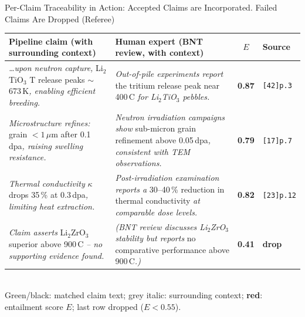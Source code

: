 \documentclass[aspectratio=169, 11pt]{beamer}
\begin{document}
\begin{frame}[shrink=25]{Per-Claim Traceability in Action: Accepted Claims are Incorporated. Failed Claims Are Dropped (Referee)}
\centering
\vspace{-4pt}
\setlength\tabcolsep{3pt}
\renewcommand{\arraystretch}{1.0}
\tiny
\begin{tabular}{@{}p{5.4cm}p{5.4cm}cp{0.9cm}@{}}
\toprule
\textbf{Pipeline claim (with surrounding context)} &
\textbf{Human expert (BNT review, with context)} &
$E$ & \textbf{Source}\\
\midrule
\textcolor{ornlgrey}{\emph{\ldots upon neutron capture,}}
\textcolor{ornlgreen}{Li$_2$TiO$_3$ T release peaks ${\sim}$673\,K}\textcolor{ornlgrey}{\emph{, enabling efficient breeding.}}
& \textcolor{ornlgrey}{\emph{Out-of-pile experiments report}}
\textcolor{ornlblack}{the tritium release peak near 400\,\textdegree{}C}\textcolor{ornlgrey}{\emph{ for Li$_2$TiO$_3$ pebbles.}}
& \textcolor{red!80!black}{\textbf{0.87}} & \texttt{[42]p.3}\\
\addlinespace[2pt]
\textcolor{ornlgrey}{\emph{Microstructure refines:}}
\textcolor{ornlgreen}{grain ${<}1\,\mu$m after 0.1\,dpa}\textcolor{ornlgrey}{\emph{, raising swelling resistance.}}
& \textcolor{ornlgrey}{\emph{Neutron irradiation campaigns show}}
\textcolor{ornlblack}{sub-micron grain refinement above 0.05\,dpa}\textcolor{ornlgrey}{\emph{, consistent with TEM observations.}}
& \textcolor{red!80!black}{\textbf{0.79}} & \texttt{[17]p.7}\\
\addlinespace[2pt]
\textcolor{ornlgrey}{\emph{Thermal conductivity}}
\textcolor{ornlgreen}{$\kappa$ drops 35\,\% at 0.3\,dpa}\textcolor{ornlgrey}{\emph{, limiting heat extraction.}}
& \textcolor{ornlgrey}{\emph{Post-irradiation examination reports a}}
\textcolor{ornlblack}{30--40\,\% reduction in thermal conductivity}\textcolor{ornlgrey}{\emph{ at comparable dose levels.}}
& \textcolor{red!80!black}{\textbf{0.82}} & \texttt{[23]p.12}\\
\addlinespace[2pt]
\textcolor{ornlgrey}{\emph{Claim asserts}}
\textcolor{cerulean}{Li$_2$ZrO$_3$ superior above 900\,\textdegree{}C}\textcolor{ornlgrey}{\emph{ -- no supporting evidence found.}}
& \textcolor{ornlgrey}{\emph{(BNT review discusses Li$_2$ZrO$_3$ stability but reports}}
\textcolor{ornlblack}{no comparative performance above 900\,\textdegree{}C}\textcolor{ornlgrey}{\emph{.)}}
& \textcolor{red!80!black}{\textbf{0.41}} & \textbf{drop}\\
\bottomrule
\end{tabular}\\[2pt]
{\tiny\color{ornlgrey}\textcolor{ornlgreen}{Green}/black: matched claim text; grey italic: surrounding context; \textcolor{red!80!black}{\textbf{red}}: entailment score $E$; last row dropped ($E<0.55$).}\\[4pt]


\end{frame}
\end{document}
